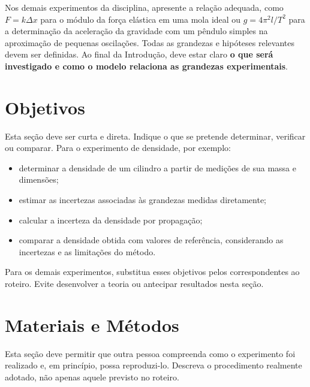 \documentclass[aps,prb,12pt,onecolumn,amsmath,amssymb]{revtex4-2}
\begin{document}
Nos demais experimentos da disciplina, apresente a relação adequada, como $F = k\Delta x$ para o módulo da força elástica em uma mola ideal ou $g = 4\pi^2l/T^2$ para a determinação da aceleração da gravidade com um pêndulo simples na aproximação de pequenas oscilações. Todas as grandezas e hipóteses relevantes devem ser definidas. Ao final da Introdução, deve estar claro \textbf{o que será investigado e como o modelo relaciona as grandezas experimentais}.

\section{Objetivos}
Esta seção deve ser curta e direta. Indique o que se pretende determinar, verificar ou comparar. Para o experimento de densidade, por exemplo:
\begin{itemize}
    \item determinar a densidade de um cilindro a partir de medições de sua massa e dimensões;
    \item estimar as incertezas associadas às grandezas medidas diretamente;
    \item calcular a incerteza da densidade por propagação;
    \item comparar a densidade obtida com valores de referência, considerando as incertezas e as limitações do método.
\end{itemize}
Para os demais experimentos, substitua esses objetivos pelos correspondentes ao roteiro. Evite desenvolver a teoria ou antecipar resultados nesta seção.

\section{Materiais e Métodos}
Esta seção deve permitir que outra pessoa compreenda como o experimento foi realizado e, em princípio, possa reproduzi-lo. Descreva o procedimento realmente adotado, não apenas aquele previsto no roteiro.

\end{document}
